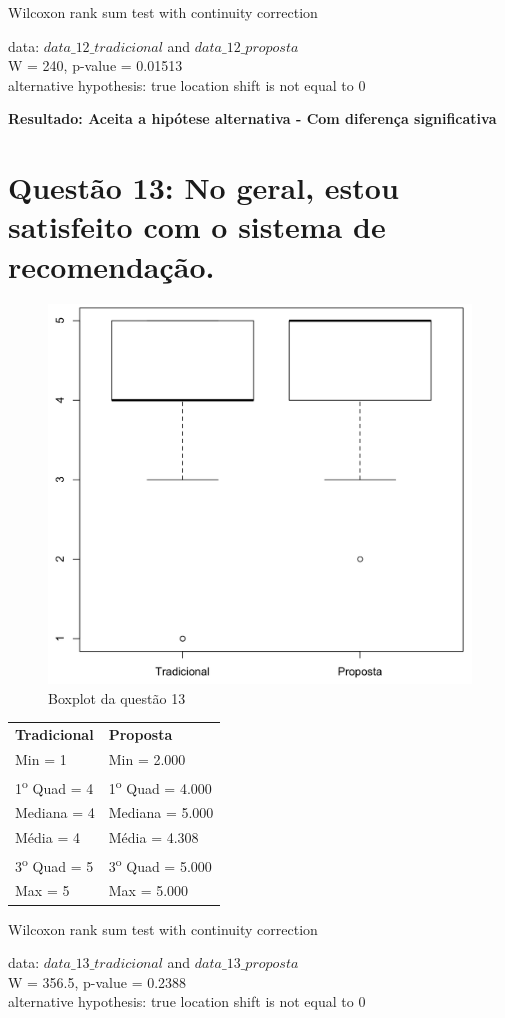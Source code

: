 Wilcoxon rank sum test with continuity correction

\noindent
data:  $data\_12\_tradicional$ and $data\_12\_proposta$\\
W = 240, p-value = 0.01513\\
alternative hypothesis: true location shift is not equal to 0

\noindent
\textbf{Resultado: Aceita a hipótese alternativa - Com diferença significativa}

\newpage
\section{Questão 13: No geral, estou satisfeito com o sistema de recomendação.}

\begin{figure}[htb]
  \caption{\label{fig:questao13-boxplot}Boxplot da questão 13}
  \begin{center}
      \includegraphics[scale=0.4]{./Figuras/questao13-boxplot.png}
  \end{center}
\end{figure}

\begin{table}[h]
\begin{tabular}{p{}p{}}
\textbf{Tradicional} & \textbf{Proposta} \\
Min = 1 & Min = 2.000\\
1\textsuperscript{o} Quad = 4 & 1\textsuperscript{o} Quad = 4.000\\
Mediana = 4 & Mediana = 5.000\\
Média = 4 & Média = 4.308\\
3\textsuperscript{o} Quad = 5 & 3\textsuperscript{o} Quad = 5.000\\
Max = 5 & Max = 5.000\\
\end{tabular}
\end{table}

Wilcoxon rank sum test with continuity correction

\noindent
data:  $data\_13\_tradicional$ and $data\_13\_proposta$\\
W = 356.5, p-value = 0.2388\\
alternative hypothesis: true location shift is not equal to 0
